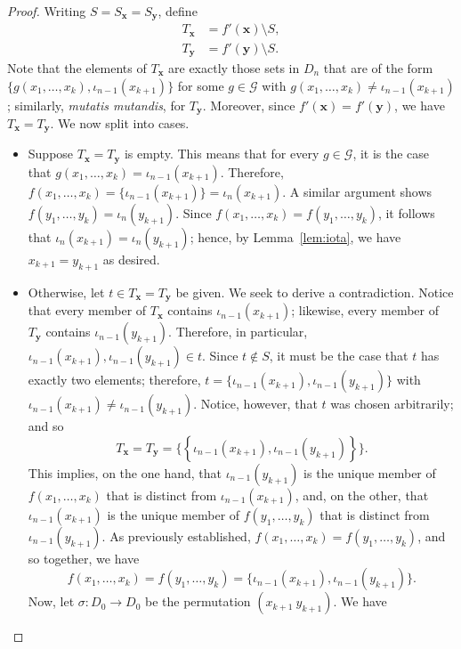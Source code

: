 \documentclass[a4paper,12pt]{article}
\theoremstyle{definition}
\theoremstyle{remark}
\begin{document}
\begin{proof}
    Writing $S = S_{\mathbf x} = S_{\mathbf y}$, define
    \begin{align*}
        T_{\mathbf x} &= f'(\mathbf x) \setminus S,\\
        T_{\mathbf y} &= f'(\mathbf y) \setminus S.
    \end{align*}
    Note that the elements of $T_{\mathbf x}$ are exactly those sets in $D_n$ that are of the form $\{g(x_1, \dots, x_k), \iota_{n-1}(x_{k+1})\}$ for some $g \in \mathcal G$ with $g(x_1, \dots, x_k) \neq \iota_{n-1}(x_{k+1})$; similarly, \emph{mutatis mutandis}, for $T_{\mathbf y}$. Moreover, since $f'(\mathbf x) = f'(\mathbf y)$, we have $T_{\mathbf x} = T_{\mathbf y}$. We now split into cases.
    \begin{itemize}
        \item Suppose $T_{\mathbf x} = T_{\mathbf y}$ is empty. This means that for every $g \in \mathcal G$, it is the case that $g(x_1, \dots, x_k) = \iota_{n-1}(x_{k+1})$. Therefore, $f(x_1, \dots, x_k) = \{\iota_{n-1}(x_{k+1})\} = \iota_n(x_{k+1})$. A similar argument shows $f(y_1, \dots, y_k) = \iota_n(y_{k+1})$. Since $f(x_1, \dots, x_k) = f(y_1, \dots, y_k)$, it follows that $\iota_n(x_{k+1}) = \iota_n(y_{k+1})$; hence, by Lemma~\ref{lem:iota}, we have $x_{k+1} = y_{k+1}$ as desired.
        \item Otherwise, let $t \in T_{\mathbf x} = T_{\mathbf y}$ be given. We seek to derive a contradiction. Notice that every member of $T_{\mathbf x}$ contains $\iota_{n-1}(x_{k+1})$; likewise, every member of $T_{\mathbf y}$ contains $\iota_{n-1}(y_{k+1})$. Therefore, in particular, $\iota_{n-1}(x_{k+1}), \iota_{n-1}(y_{k+1}) \in t$. Since $t \notin S$, it must be the case that $t$ has exactly two elements; therefore, $t = \{\iota_{n-1}(x_{k+1}), \iota_{n-1}(y_{k+1})\}$ with $\iota_{n-1}(x_{k+1}) \neq \iota_{n-1}(y_{k+1})$. Notice, however, that $t$ was chosen arbitrarily; and so
        \[T_{\mathbf x} = T_{\mathbf y} = \big\{\left\{\iota_{n-1}(x_{k+1}), \iota_{n-1}(y_{k+1})\right\}\big\}.\]
        This implies, on the one hand, that $\iota_{n-1}(y_{k+1})$ is the unique member of $f(x_1, \dots, x_k)$ that is distinct from $\iota_{n-1}(x_{k+1})$, and, on the other, that $\iota_{n-1}(x_{k+1})$ is the unique member of $f(y_1, \dots, y_k)$ that is distinct from $\iota_{n-1}(y_{k+1})$. As previously established, $f(x_1, \dots, x_k) = f(y_1, \dots, y_k)$, and so together, we have
        \[f(x_1, \dots, x_k) = f(y_1, \dots, y_k) = \{\iota_{n-1}(x_{k+1}), \iota_{n-1}(y_{k+1})\}.\]
        Now, let $\sigma : D_0 \to D_0$ be the permutation $(x_{k+1}\ y_{k+1})$. We have

\end{itemize}
\end{proof}
\end{document}
